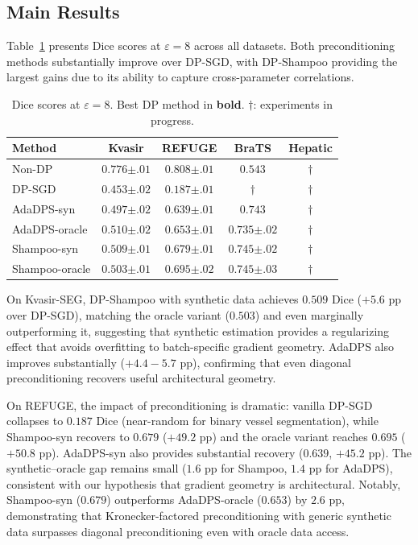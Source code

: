 \documentclass[runningheads]{llncs}
\begin{document}
\subsection{Main Results}
\label{subsec:main_results}

Table~\ref{tab:main} presents Dice scores at $\varepsilon{=}8$ across all datasets. Both preconditioning methods substantially improve over DP-SGD, with DP-Shampoo providing the largest gains due to its ability to capture cross-parameter correlations.

\begin{table}[t]
\centering
\caption{Dice scores at $\varepsilon{=}8$. Best DP method in \textbf{bold}. $\dagger$: experiments in progress.}\label{tab:main}
\renewcommand{\arraystretch}{1.15}
\small
\begin{tabular}{lcccc}
\toprule
\textbf{Method} & \textbf{Kvasir} & \textbf{REFUGE} & \textbf{BraTS} & \textbf{Hepatic} \\
\midrule
Non-DP & $0.776{\scriptstyle\pm.01}$ & $0.808{\scriptstyle\pm.01}$ & $0.543$ & $\dagger$ \\
\midrule
DP-SGD & $0.453{\scriptstyle\pm.02}$ & $0.187{\scriptstyle\pm.01}$ & $\dagger$ & $\dagger$ \\
AdaDPS-syn & $0.497{\scriptstyle\pm.02}$ & $0.639{\scriptstyle\pm.01}$ & $0.743$ & $\dagger$ \\
AdaDPS-oracle & $0.510{\scriptstyle\pm.02}$ & $0.653{\scriptstyle\pm.01}$ & $0.735{\scriptstyle\pm.02}$ & $\dagger$ \\
Shampoo-syn & $\mathbf{0.509}{\scriptstyle\pm.01}$ & $0.679{\scriptstyle\pm.01}$ & $\mathbf{0.745}{\scriptstyle\pm.02}$ & $\dagger$ \\
Shampoo-oracle & $0.503{\scriptstyle\pm.01}$ & $\mathbf{0.695}{\scriptstyle\pm.02}$ & $0.745{\scriptstyle\pm.03}$ & $\dagger$ \\
\bottomrule
\end{tabular}
\end{table}

On Kvasir-SEG, DP-Shampoo with synthetic data achieves $0.509$ Dice ($+5.6$ pp over DP-SGD), matching the oracle variant ($0.503$) and even marginally outperforming it, suggesting that synthetic estimation provides a regularizing effect that avoids overfitting to batch-specific gradient geometry. AdaDPS also improves substantially ($+4.4{-}5.7$ pp), confirming that even diagonal preconditioning recovers useful architectural geometry.

On REFUGE, the impact of preconditioning is dramatic: vanilla DP-SGD collapses to $0.187$ Dice (near-random for binary vessel segmentation), while Shampoo-syn recovers to $0.679$ ($+49.2$ pp) and the oracle variant reaches $0.695$ ($+50.8$ pp). AdaDPS-syn also provides substantial recovery ($0.639$, $+45.2$ pp). The synthetic--oracle gap remains small ($1.6$ pp for Shampoo, $1.4$ pp for AdaDPS), consistent with our hypothesis that gradient geometry is architectural. Notably, Shampoo-syn ($0.679$) outperforms AdaDPS-oracle ($0.653$) by $2.6$ pp, demonstrating that Kronecker-factored preconditioning with generic synthetic data surpasses diagonal preconditioning even with oracle data access.
\end{document}
